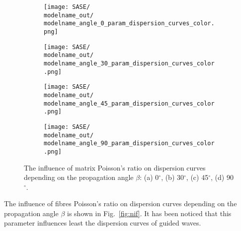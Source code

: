 \documentclass[preprint,12pt]{elsarticle}
\begin{document}
\begin{figure} [h!]
	\centering
	\newcommand{\modelname}{SASE6}
	\begin{subfigure}[b]{0.49\textwidth}
		\centering
		\texttt{[image: SASE/\\modelname\_out/\\modelname\_angle\_0\_param\_dispersion\_curves\_color.png]}
		\caption{}
		\label{fig:nim0}
	\end{subfigure}
	\hfill
	\begin{subfigure}[b]{0.49\textwidth}
		\centering
		\texttt{[image: SASE/\\modelname\_out/\\modelname\_angle\_30\_param\_dispersion\_curves\_color.png]}
		\caption{}
		\label{fig:nim30}
	\end{subfigure}
	\begin{subfigure}[b]{0.49\textwidth}
		\centering
		\texttt{[image: SASE/\\modelname\_out/\\modelname\_angle\_45\_param\_dispersion\_curves\_color.png]}
		\caption{}
		\label{fig:nim45}
	\end{subfigure}
	\hfill
	\begin{subfigure}[b]{0.49\textwidth}
		\centering
		\texttt{[image: SASE/\\modelname\_out/\\modelname\_angle\_90\_param\_dispersion\_curves\_color.png]}
		\caption{}
		\label{fig:nim90}
	\end{subfigure}
	\caption{The influence of matrix Poisson's ratio on dispersion curves depending on the propagation angle $\beta$: (a) 0$^{\circ}$, (b) 30$^{\circ}$, (c) 45$^{\circ}$, (d) 90$^{\circ}$.} 
	\label{fig:nim}
\end{figure}
\clearpage

The influence of fibres Poisson's ratio on dispersion curves depending on the propagation angle $\beta$ is shown in Fig.~\ref{fig:nif}. It has been noticed that this parameter influences least the dispersion curves of guided waves.
\end{document}
